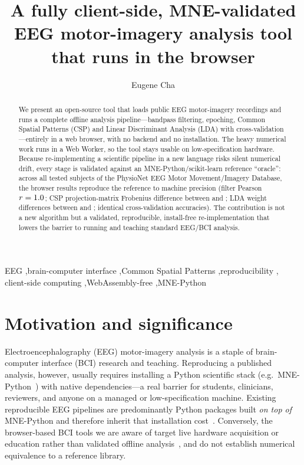 \documentclass[5p]{elsarticle}
\newcommand{\todo}[1]{\textbf{[TODO: #1]}}
\begin{document}
\begin{frontmatter}

\title{A fully client-side, MNE-validated EEG motor-imagery analysis tool that runs in the browser}

\author{Eugene Cha}
\address{\todo{author affiliation}}

\begin{abstract}
We present an open-source tool that loads public EEG motor-imagery recordings and runs a complete
offline analysis pipeline---bandpass filtering, epoching, Common Spatial Patterns (CSP) and Linear
Discriminant Analysis (LDA) with cross-validation---entirely in a web browser, with no backend and
no installation. The heavy numerical work runs in a Web Worker, so the tool stays usable on
low-specification hardware. Because re-implementing a scientific pipeline in a new language risks
silent numerical drift, every stage is validated against an MNE-Python/scikit-learn reference
``oracle'': across all \Nsubjects{} tested subjects of the PhysioNet EEG Motor Movement/Imagery
Database, the browser results reproduce the reference to machine precision (filter Pearson
$r=1.0$; CSP projection-matrix Frobenius difference between \CspFrobMin{} and \CspFrobMax{};
LDA weight differences between \LdaDiffMin{} and \LdaDiffMax{}; identical cross-validation
accuracies). The contribution is not a new algorithm but a validated, reproducible, install-free
re-implementation that lowers the barrier to running and teaching standard EEG/BCI analysis.
\end{abstract}

\begin{keyword}
EEG \sep brain-computer interface \sep Common Spatial Patterns \sep reproducibility \sep
client-side computing \sep WebAssembly-free \sep MNE-Python
\end{keyword}

\end{frontmatter}

\section{Motivation and significance}
Electroencephalography (EEG) motor-imagery analysis is a staple of brain-computer interface (BCI)
research and teaching. Reproducing a published analysis, however, usually requires installing a
Python scientific stack (e.g.\ MNE-Python~\cite{gramfort2013mne}) with native dependencies---a real
barrier for students, clinicians, reviewers, and anyone on a managed or low-specification machine.
Existing reproducible EEG pipelines are predominantly Python packages built \emph{on top of}
MNE-Python and therefore inherit that installation cost~\cite{mnebidspipeline,meggie,eegpipeline,pylossless,eegpype}.
Conversely, the browser-based BCI tools we are aware of target live hardware acquisition or
education rather than validated offline analysis~\cite{webbci,bci2000web,neuroblock,pieeg}, and do
not establish numerical equivalence to a reference library.
\end{document}
